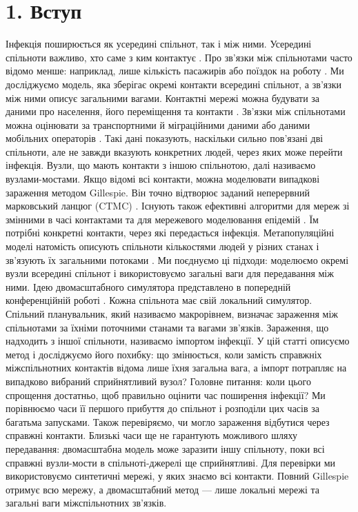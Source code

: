 \documentclass[11pt,a4paper]{article}
\begin{document}
\section*{1. Вступ}

Інфекція поширюється як усередині спільнот, так і між ними. Усередині спільноти важливо, хто саме з ким контактує \citep{keeling2005,pastorsatorras2015,kiss2017}. Про зв'язки між спільнотами часто відомо менше: наприклад, лише кількість пасажирів або поїздок на роботу \citep{balcan2009,barbosa2018human}. Ми досліджуємо модель, яка зберігає окремі контакти всередині спільнот, а зв'язки між ними описує загальними вагами.
Контактні мережі можна будувати за даними про населення, його переміщення та контакти \citep{eubank2004,danon2011}. Зв'язки між спільнотами можна оцінювати за транспортними й міграційними даними або даними мобільних операторів \citep{barbosa2018human,chang2021}. Такі дані показують, наскільки сильно пов'язані дві спільноти, але не завжди вказують конкретних людей, через яких може перейти інфекція. Вузли, що мають контакти з іншою спільнотою, далі називаємо вузлами-мостами.
Якщо відомі всі контакти, можна моделювати випадкові зараження методом Gillespie. Він точно відтворює заданий неперервний марковський ланцюг (CTMC) \citep{gillespie1977exact,gibson2000}. Існують також ефективні алгоритми для мереж зі змінними в часі контактами та для мережевого моделювання епідемій \citep{vestergaard2015,kuryliak2025simulating}. Їм потрібні конкретні контакти, через які передається інфекція. Метапопуляційні моделі натомість описують спільноти кількостями людей у різних станах і зв'язують їх загальними потоками \citep{colizza2007reaction,colizza2008,balcan2010modeling,ajelli2010}. Ми поєднуємо ці підходи: моделюємо окремі вузли всередині спільнот і використовуємо загальні ваги для передавання між ними.
Ідею двомасштабного симулятора представлено в попередній конференційній роботі \citep{kuryliak2025towards}. Кожна спільнота має свій локальний симулятор. Спільний планувальник, який називаємо макрорівнем, визначає зараження між спільнотами за їхніми поточними станами та вагами зв'язків. Зараження, що надходить з іншої спільноти, називаємо імпортом інфекції. У цій статті описуємо метод і досліджуємо його похибку: що змінюється, коли замість справжніх міжспільнотних контактів відома лише їхня загальна вага, а імпорт потрапляє на випадково вибраний сприйнятливий вузол?
Головне питання: коли цього спрощення достатньо, щоб правильно оцінити час поширення інфекції? Ми порівнюємо часи її першого прибуття до спільнот і розподіли цих часів за багатьма запусками. Також перевіряємо, чи могло зараження відбутися через справжні контакти. Близькі часи ще не гарантують можливого шляху передавання: двомасштабна модель може заразити іншу спільноту, поки всі справжні вузли-мости в спільноті-джерелі ще сприйнятливі. Для перевірки ми використовуємо синтетичні мережі, у яких знаємо всі контакти. Повний Gillespie отримує всю мережу, а двомасштабний метод --- лише локальні мережі та загальні ваги міжспільнотних зв'язків.
\end{document}
